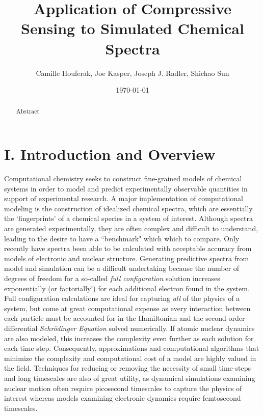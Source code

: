 \documentclass[11pt]{article}
\title{Application of Compressive Sensing to Simulated Chemical Spectra}
\author{Camille Houferak, Joe Kasper, Joseph J. Radler, Shichao Sun}
\date{\today}                                           %
\begin{document}
\maketitle
\begin{abstract}

Abstract

\end{abstract}


\section*{I.	Introduction and Overview}  %


\par Computational chemistry seeks to construct fine-grained models of chemical systems in order to model and predict experimentally observable quantities in support of experimental research.  A major implementation of computational modeling is the construction of idealized chemical spectra, which are essentially the `fingerprints' of a chemical species in a system of interest.  Although spectra are generated experimentally, they are often complex and difficult to understand, leading to the desire to have a ``benchmark" which which to compare.  Only recently have spectra been able to be calculated with acceptable accuracy from models of electronic and nuclear structure. Generating predictive spectra from model and simulation can be a difficult undertaking because the number of degrees of freedom for a so-called \emph{full configuration} solution increases exponentially (or factorially!) for each additional electron found in the system. Full configuration calculations are ideal for capturing \emph{all} of the physics of a system, but come at great computational expense as every interaction between each particle must be accounted for in the Hamiltonian and the second-order differential \emph{Schr\"odinger Equation} solved numerically.  If atomic nuclear dynamics are also modeled, this increases the complexity even further as each solution for each time step.  Consequently, approximations and computational algorithms that minimize the complexity and computational cost of a model are highly valued in the field. Techniques for reducing or removing the necessity of small time-steps and long timescales are also of great utility, as dynamical simulations examining nuclear motion often require picosecond timescales to capture the physics of interest whereas models examining electronic dynamics require femtosecond timescales.\\ 
\end{document}
